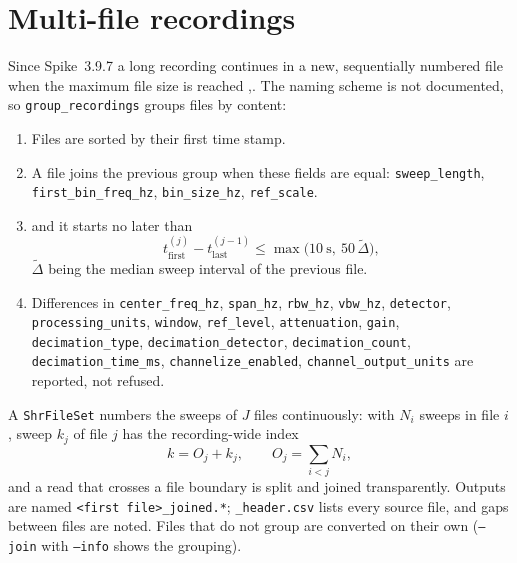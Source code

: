 \documentclass[11pt,a4paper]{article}
\newcommand{\code}[1]{\texttt{#1}}
\begin{document}
\section{Multi-file recordings}\label{sec:join}
Since Spike~3.9.7 a long recording continues in a new, sequentially numbered file when the maximum file size is
reached \cite{r9},\cite{r12}. The naming scheme is not documented, so \code{group\_recordings} groups files by
content:
\begin{enumerate}[nosep]
\item Files are sorted by their first time stamp.
\item A file joins the previous group when these fields are equal: \texttt{sweep\_\allowbreak{}length}, \texttt{first\_\allowbreak{}bin\_\allowbreak{}freq\_\allowbreak{}hz}, \texttt{bin\_\allowbreak{}size\_\allowbreak{}hz}, \texttt{ref\_\allowbreak{}scale}.
\item and it starts no later than
      \begin{equation}t_\mathrm{first}^{(j)}-t_\mathrm{last}^{(j-1)}\le\max\big(10~\mathrm s,\ 50\,\tilde\Delta\big),\end{equation}
      $\tilde\Delta$ being the median sweep interval of the previous file.
\item Differences in \texttt{center\_\allowbreak{}freq\_\allowbreak{}hz}, \texttt{span\_\allowbreak{}hz}, \texttt{rbw\_\allowbreak{}hz}, \texttt{vbw\_\allowbreak{}hz}, \texttt{detector}, \texttt{processing\_\allowbreak{}units}, \texttt{window}, \texttt{ref\_\allowbreak{}level}, \texttt{attenuation}, \texttt{gain}, \texttt{decimation\_\allowbreak{}type}, \texttt{decimation\_\allowbreak{}detector}, \texttt{decimation\_\allowbreak{}count}, \texttt{decimation\_\allowbreak{}time\_\allowbreak{}ms}, \texttt{channelize\_\allowbreak{}enabled}, \texttt{channel\_\allowbreak{}output\_\allowbreak{}units} are reported, not refused.
\end{enumerate}
A \code{ShrFileSet} numbers the sweeps of $J$ files continuously: with $N_i$ sweeps in file $i$, sweep $k_j$ of
file $j$ has the recording-wide index
\begin{equation}k=O_j+k_j,\qquad O_j=\sum_{i<j}N_i ,\end{equation}
and a read that crosses a file boundary is split and joined transparently. Outputs are named
\code{<first file>\_joined.*}; \code{\_header.csv} lists every source file, and gaps between files are noted.
Files that do not group are converted on their own (\code{--join} with \code{--info} shows the grouping).
\end{document}
